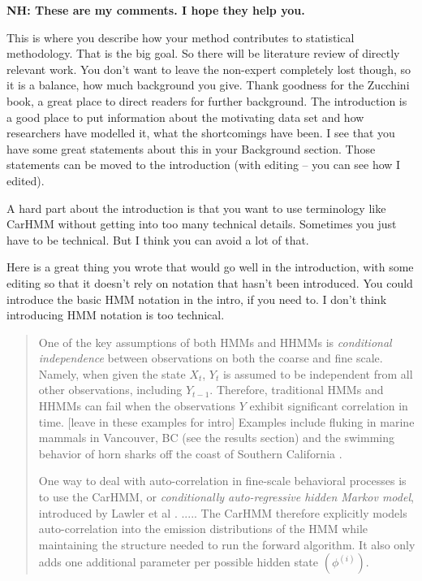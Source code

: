 {\bf{NH: These are my comments.  I hope they help you.}}

This is where you describe how your method contributes to statistical methodology. That is the big goal.  So there will be literature review of directly relevant work.  You don't want to leave the non-expert completely lost though, so it is a balance, how much background you give.
Thank goodness for the Zucchini book, a great place to direct readers for further background.  
The introduction is a good place to put information about the motivating data set and how researchers have modelled it, what the shortcomings have been.  I see that you have some great statements about this in your Background section.  Those statements can be moved to the introduction (with editing -- you can see how I edited).

A hard part about the introduction is that you want to use terminology like CarHMM without getting into too many technical details.  Sometimes you just have to be technical.  But I think you can avoid a lot of that.

Here is a great thing you wrote that would go well in the introduction, with some editing so that it doesn't rely on notation that hasn't been introduced. You could introduce the basic HMM notation in the intro, if you need to.  I don't think introducing HMM notation is too technical.
\begin{quote}
 One of the key assumptions of both HMMs and HHMMs is \textit{conditional independence} between observations on both the coarse and fine scale. Namely, when given the state $X_t$, $Y_t$ is assumed to be independent from all other observations, including $Y_{t-1}$. Therefore, traditional HMMs and HHMMs can fail when the observations $Y$ exhibit significant correlation in time.
 [leave in these examples for intro]  Examples include fluking in marine mammals in Vancouver, BC (see the results section) and the swimming behavior of horn sharks off the coast of Southern California \citep{Adam:2019}.

One way to deal with auto-correlation in fine-scale behavioral processes is to use the CarHMM, or \textit{conditionally auto-regressive hidden Markov model}, introduced by Lawler et al \citep{Lawler:2019}. .....  The CarHMM therefore explicitly models auto-correlation into the emission distributions of the HMM while maintaining the structure needed to run the forward algorithm. It also only adds one additional parameter per possible hidden state
$(\phi^{(i)})$. 
\end{quote}

\fi